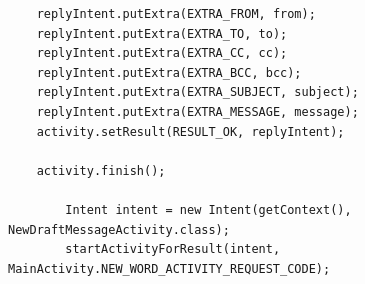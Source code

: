 \documentclass[a4paper,11pt]{article}
\begin{document}
\begin{appendices}
\begin{lstlisting}
    replyIntent.putExtra(EXTRA_FROM, from);
    replyIntent.putExtra(EXTRA_TO, to);
    replyIntent.putExtra(EXTRA_CC, cc);
    replyIntent.putExtra(EXTRA_BCC, bcc);
    replyIntent.putExtra(EXTRA_SUBJECT, subject);
    replyIntent.putExtra(EXTRA_MESSAGE, message);
    activity.setResult(RESULT_OK, replyIntent);

    activity.finish();

        Intent intent = new Intent(getContext(), NewDraftMessageActivity.class);
        startActivityForResult(intent, MainActivity.NEW_WORD_ACTIVITY_REQUEST_CODE);

\end{lstlisting}

\end{appendices}
\end{document}
